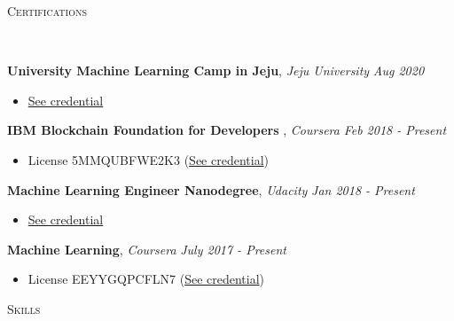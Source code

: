 \documentclass[10pt]{article}
\newenvironment{changemargin}[2]{
  \begin{list}{}{
    \setlength{\topsep}{0pt}
    \setlength{\leftmargin}{#1}
    \setlength{\rightmargin}{#2}
    \setlength{\listparindent}{\parindent}
    \setlength{\itemindent}{\parindent}
    \setlength{\parsep}{\parskip}
  }
  \item[]}{\end{list}
}
\newcommand{\lineover}{
	\begin{changemargin}{-0.05in}{-0.05in}
		\vspace*{-8pt}
		\hrulefill \\
		\vspace*{-2pt}
	\end{changemargin}
}
\newcommand{\header}[1]{
	\begin{changemargin}{-0.5in}{-0.5in}
		\scshape{#1}\\
  	\lineover
	\end{changemargin}
}
\newcommand{\labdescription}[1]{
	\begin{changemargin}{0.15in}{0.15in}
    \smallskip
		{#1}
    \medskip
	\end{changemargin}
}
\newcommand{\labtitle}[3]{
	\textbf{#1}, \emph{#2} \hfill \emph{#3}\\
}
\newenvironment{body} {
	\vspace*{-16pt}
	\begin{changemargin}{-0.25in}{-0.5in}
  }
	{\end{changemargin}
}
\begin{document}
\medskip


\header{Certifications}

\begin{body}
	\vspace{14pt}

  	\labtitle{University Machine Learning Camp in Jeju}{Jeju University}{Aug 2020}
  \labdescription {
  	\begin{itemize} \itemsep -0pt  %
      \item \href{https://drive.google.com/file/d/1lV5w4cdCMVgFnBGu2sHeTigXFEZCX3Sr/view}{See credential}
  	\end{itemize}
  }
  	\labtitle{IBM Blockchain Foundation for Developers }{Coursera}{Feb 2018 - Present}
  \labdescription {
  	\begin{itemize} \itemsep -0pt  %
      \item License 5MMQUBFWE2K3 (\href{https://www.credly.com/badges/a9f84e03-9bc0-462e-8dd2-66ed9c7878c0/linked_in_profile}{See credential})
  	\end{itemize}
  }
  
  	\labtitle{Machine Learning Engineer Nanodegree}{Udacity}{Jan 2018 - Present}
  \labdescription {
  	\begin{itemize} \itemsep -0pt  %
        \item \href{https://graduation.udacity.com/confirm/AN2EMAQD}{See credential}
  	\end{itemize}
  }

  	\labtitle{Machine Learning}{Coursera}{July 2017 - Present}
  \labdescription {
  	\begin{itemize} \itemsep -0pt  %
      \item License EEYYGQPCFLN7 (\href{https://www.coursera.org/account/accomplishments/verify/EEYYGQPCFLN7}{See credential})
  	\end{itemize}
  }
  


\end{body}

\medskip

\header{Skills}
\end{document}
